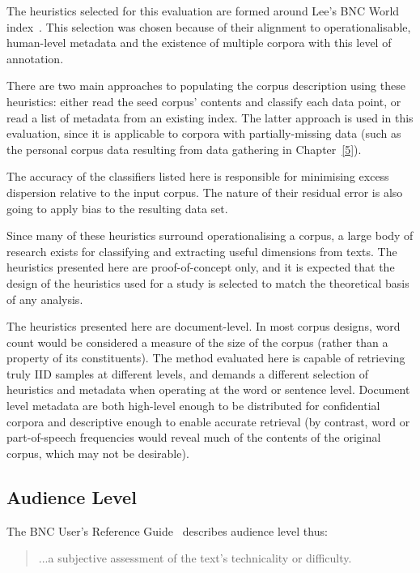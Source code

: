 The heuristics selected for this evaluation are formed around Lee's BNC World index~\cite{lee2003bnc}.  This selection was chosen because of their alignment to operationalisable, human-level metadata and the existence of multiple corpora with this level of annotation.



There are two main approaches to populating the corpus description using these heuristics: either read the seed corpus' contents and classify each data point, or read a list of metadata from an existing index.  The latter approach is used in this evaluation, since it is applicable to corpora with partially-missing data (such as the personal corpus data resulting from data gathering in Chapter~\ref{5}).

The accuracy of the classifiers listed here is responsible for minimising excess dispersion relative to the input corpus.  The nature of their residual error is also going to apply bias to the resulting data set.

Since many of these heuristics surround operationalising a corpus, a large body of research exists for classifying and extracting useful dimensions from texts.  The heuristics presented here are proof-of-concept only, and it is expected that the design of the heuristics used for a study is selected to match the theoretical basis of any analysis.

The heuristics presented here are document-level.  In most corpus designs, word count would be considered a measure of the size of the corpus (rather than a property of its constituents).  The method evaluated here is capable of retrieving truly IID samples at different levels, and demands a different selection of heuristics and metadata when operating at the word or sentence level.  Document level metadata are both high-level enough to be distributed for confidential corpora and descriptive enough to enable accurate retrieval (by contrast, word or part-of-speech frequencies would reveal much of the contents of the original corpus, which may not be desirable).




\subsection{Audience Level}
The BNC User's Reference Guide~\cite{CITE} describes audience level thus:

\begin{quote}
...a subjective assessment of the text's technicality or difficulty.
\end{quote}

